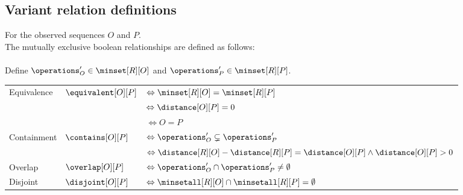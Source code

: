 \subsection*{Variant relation definitions}
%
For the observed sequences $O$ and $P$.\\
The mutually exclusive boolean relationships are defined as follows: \\
\\
Define $\operations_O' \in \minset[R][O]$ and $\operations_P' \in \minset[R][P]$.\\
%
%
\begin{table}[h!]
    \begin{tabular}{l l l}
        Equivalence & $\equivalent[O][P]$ & $\Leftrightarrow \minset[R][O] = \minset[R][P]$ \\
                    &                     & $\Leftrightarrow \distance[O][P] = 0$ \\
                    &                     &  $\Leftrightarrow O = P$ \\
        Containment & $\contains[O][P]$   & $\Leftrightarrow \operations_O' \subsetneq \operations_P'$ \\ %
                    &                     & $\Leftrightarrow \distance[R][O] - \distance[R][P] = \distance[O][P] \land \distance[O][P] > 0$ \\
        Overlap     & $\overlap[O][P]$    & $\Leftrightarrow \operations_O' \cap \operations_P' \ne \emptyset$ \\ %
        Disjoint   & $\disjoint[O][P]$    & $\Leftrightarrow \minsetall[R][O] \cap \minsetall[R][P] = \emptyset$ \\
    \end{tabular}
\end{table}
%
